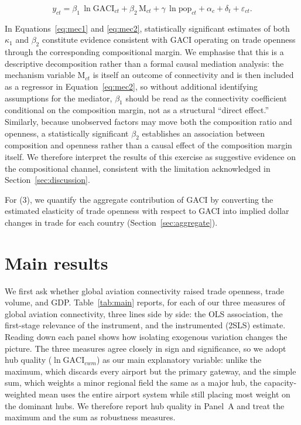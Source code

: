 \begin{equation}
y_{ct}
= \beta_1\,\ln\mathrm{GACI}_{ct}
+ \beta_2\,\mathrm{M}_{ct}
+ \gamma\,\ln\mathrm{pop}_{ct}
+ \alpha_c + \delta_t + \varepsilon_{ct}.
\label{eq:mec2}
\end{equation}

In Equations~\eqref{eq:mec1} and \eqref{eq:mec2}, statistically significant estimates of both $\kappa_1$ and $\beta_2$ constitute evidence consistent with GACI operating on trade openness through the corresponding compositional margin. We emphasise that this is a descriptive decomposition rather than a formal causal mediation analysis: the mechanism variable $\mathrm{M}_{ct}$ is itself an outcome of connectivity and is then included as a regressor in Equation~\eqref{eq:mec2}, so without additional identifying assumptions for the mediator, $\beta_1$ should be read as the connectivity coefficient conditional on the composition margin, not as a structural ``direct effect.'' Similarly, because unobserved factors may move both the composition ratio and openness, a statistically significant $\beta_2$ establishes an association between composition and openness rather than a causal effect of the composition margin itself. We therefore interpret the results of this exercise as suggestive evidence on the compositional channel, consistent with the limitation acknowledged in Section~\ref{sec:discussion}.

For (3), we quantify the aggregate contribution of GACI by converting the estimated elasticity of trade openness with respect to GACI into implied dollar changes in trade for each country (Section~\ref{sec:aggregate}).

\section{Main results}
\label{sec:results}

We first ask whether global aviation connectivity raised trade openness, trade
volume, and GDP. Table~\ref{tab:main} reports, for each of our three measures of
global aviation connectivity, three lines side by side: the OLS association, the
first-stage relevance of the instrument, and the instrumented (2SLS) estimate.
Reading down each panel shows how isolating exogenous variation changes the
picture. The three measures agree closely in sign and significance, so we adopt
hub quality ($\ln\mathrm{GACI}_{cwm}$) as our main explanatory variable: unlike
the maximum, which discards every airport but the primary gateway, and the simple
sum, which weights a minor regional field the same as a major hub, the
capacity-weighted mean uses the entire airport system while still placing most
weight on the dominant hubs. We therefore report hub quality in Panel~A and treat
the maximum and the sum as robustness measures.

